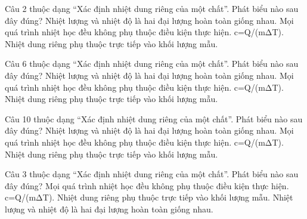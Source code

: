 \begin{ex}
Câu 2 thuộc dạng “Xác định nhiệt dung riêng của một chất”. Phát biểu nào sau đây đúng?
\choice
{Nhiệt lượng và nhiệt độ là hai đại lượng hoàn toàn giống nhau.}
{Mọi quá trình nhiệt học đều không phụ thuộc điều kiện thực hiện.}
{\True c=Q/(mΔT).}
{Nhiệt dung riêng phụ thuộc trực tiếp vào khối lượng mẫu.}
\end{ex}

\begin{ex}
Câu 6 thuộc dạng “Xác định nhiệt dung riêng của một chất”. Phát biểu nào sau đây đúng?
\choice
{Nhiệt lượng và nhiệt độ là hai đại lượng hoàn toàn giống nhau.}
{Mọi quá trình nhiệt học đều không phụ thuộc điều kiện thực hiện.}
{\True c=Q/(mΔT).}
{Nhiệt dung riêng phụ thuộc trực tiếp vào khối lượng mẫu.}
\end{ex}

\begin{ex}
Câu 10 thuộc dạng “Xác định nhiệt dung riêng của một chất”. Phát biểu nào sau đây đúng?
\choice
{Nhiệt lượng và nhiệt độ là hai đại lượng hoàn toàn giống nhau.}
{Mọi quá trình nhiệt học đều không phụ thuộc điều kiện thực hiện.}
{\True c=Q/(mΔT).}
{Nhiệt dung riêng phụ thuộc trực tiếp vào khối lượng mẫu.}
\end{ex}

\begin{ex}
Câu 3 thuộc dạng “Xác định nhiệt dung riêng của một chất”. Phát biểu nào sau đây đúng?
\choice
{Mọi quá trình nhiệt học đều không phụ thuộc điều kiện thực hiện.}
{\True c=Q/(mΔT).}
{Nhiệt dung riêng phụ thuộc trực tiếp vào khối lượng mẫu.}
{Nhiệt lượng và nhiệt độ là hai đại lượng hoàn toàn giống nhau.}
\end{ex}

